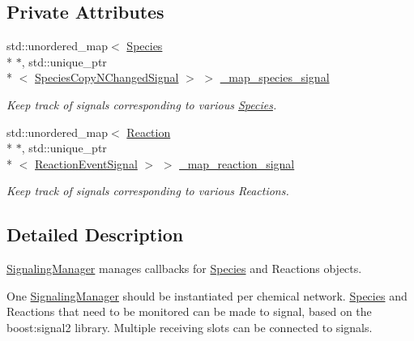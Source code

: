 \subsection*{Private Attributes}
\begin{DoxyCompactItemize}
\item 
std\-::unordered\-\_\-map$<$ \hyperlink{classSpecies}{Species} \\*
$\ast$, std\-::unique\-\_\-ptr\\*
$<$ \hyperlink{Signaling_8h_add19c738ac9a6c73d5900828cf915993}{Species\-Copy\-N\-Changed\-Signal} $>$ $>$ \hyperlink{classSignalingManager_a4d3a730d33369a40aa09b711dcdc74f0}{\-\_\-map\-\_\-species\-\_\-signal}
\begin{DoxyCompactList}\small\item\em Keep track of signals corresponding to various \hyperlink{classSpecies}{Species}. \end{DoxyCompactList}\item 
std\-::unordered\-\_\-map$<$ \hyperlink{classReaction}{Reaction} \\*
$\ast$, std\-::unique\-\_\-ptr\\*
$<$ \hyperlink{Signaling_8h_aa6022d69bb45ab7f3c304c00f34199fd}{Reaction\-Event\-Signal} $>$ $>$ \hyperlink{classSignalingManager_a868051ed639fe807560e68e0c9060223}{\-\_\-map\-\_\-reaction\-\_\-signal}
\begin{DoxyCompactList}\small\item\em Keep track of signals corresponding to various Reactions. \end{DoxyCompactList}\end{DoxyCompactItemize}


\subsection{Detailed Description}
\hyperlink{classSignalingManager}{Signaling\-Manager} manages callbacks for \hyperlink{classSpecies}{Species} and Reactions objects. 

One \hyperlink{classSignalingManager}{Signaling\-Manager} should be instantiated per chemical network. \hyperlink{classSpecies}{Species} and Reactions that need to be monitored can be made to signal, based on the boost\-:signal2 library. Multiple receiving slots can be connected to signals.

